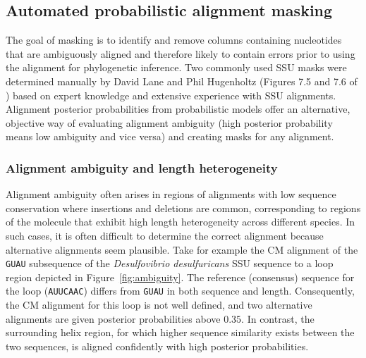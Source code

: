 \subsection{Automated probabilistic alignment masking}

The goal of masking is to identify and remove columns containing
nucleotides that are ambiguously aligned and therefore likely to contain
errors prior to using the alignment for phylogenetic inference.  Two
commonly used SSU masks were determined manually by David Lane and
Phil Hugenholtz (Figures 7.5 and 7.6 of \cite{Nawrocki09b}) based on
expert knowledge and extensive experience with SSU alignments.
Alignment posterior probabilities from
probabilistic models offer an alternative, objective way of evaluating
alignment ambiguity (high posterior probability means low ambiguity
and vice versa) and creating masks for any alignment.

\subsubsection{Alignment ambiguity and length heterogeneity}

Alignment ambiguity often arises in regions of alignments with low
sequence conservation where insertions and deletions are common,
corresponding to regions of the molecule that exhibit high length
heterogeneity across different species. In such cases, it is often
difficult to determine the correct alignment because alternative
alignments seem plausible. Take for example the CM alignment
of the {\tt GUAU} subsequence of the \emph{Desulfovibrio
desulfuricans} SSU sequence to a loop region depicted in
Figure~\ref{fig:ambiguity}. The reference (consensus) sequence for the
loop ({\tt AUUCAAC}) differs from {\tt GUAU} in both sequence and
length. Consequently, the CM alignment for this loop is not well
defined, and two alternative alignments are given posterior
probabilities above $0.35$.  In contrast, the surrounding helix
region, for which higher sequence similarity exists between the two
sequences, is aligned confidently with high posterior probabilities.

